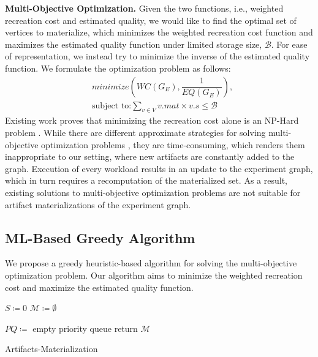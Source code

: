 \textbf{Multi-Objective Optimization.}
Given the two functions, i.e., weighted recreation cost and estimated quality, we would like to find the optimal set of vertices to materialize, which minimizes the weighted recreation cost function and maximizes the estimated quality function under limited storage size, $\mathcal{B}$.
For ease of representation, we instead try to minimize the inverse of the estimated quality function.
We formulate the optimization problem as follows:
\begin{equation}\label{multi-obj-opt}
\begin{split}
& minimize(WC(G_E), \dfrac{1}{EQ(G_E)}), \\
& \text{subject to:} \sum\limits_{v \in V} v.mat \times v.s \leq \mathcal{B}
\end{split}
\end{equation}
Existing work proves that minimizing the recreation cost alone is an NP-Hard problem \cite{bhattacherjee2015principles}.
While there are different approximate strategies for solving multi-objective optimization problems \cite{coello2007evolutionary}, they are time-consuming, which renders them inappropriate to our setting, where new artifacts are constantly added to the graph.
Execution of every workload results in an update to the experiment graph, which in turn requires a recomputation of the materialized set.
As a result, existing solutions to multi-objective optimization problems are not suitable for artifact materializations of the experiment graph.
\subsection{ML-Based Greedy Algorithm}\label{subsec-ml-based-materialization}
We propose a greedy heuristic-based algorithm for solving the multi-objective optimization problem.
Our algorithm aims to minimize the weighted recreation cost and maximize the estimated quality function.
\begin{algorithm}[h]
$S \coloneqq 0$
$\mathcal{M} \coloneqq \emptyset$

$PQ \coloneqq $ empty priority queue\;
return $\mathcal{M}$\;
\caption{Artifacts-Materialization}\label{algorithm-materialization}
\end{algorithm}

